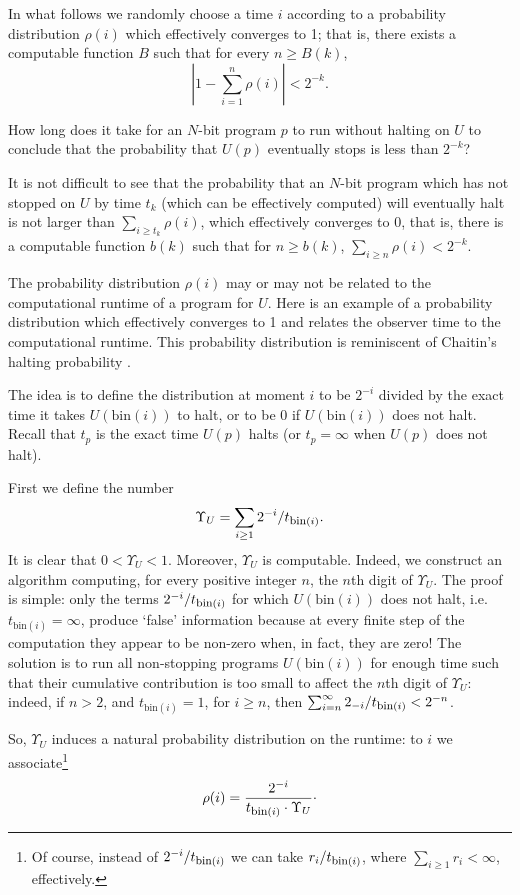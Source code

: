 \documentclass[12pt,twoside,openright]{report}
\newcommand{\bin}{\mbox{bin}}
\newcommand{\fbin}{\mbox{\rm \footnotesize{bin}}}
\begin{document}
In what follows we randomly choose a time $i$ according to a probability distribution $\rho(i)$ which effectively converges to 1; that is, there exists a computable function $B$ such that for every $n\ge B(k)$, $$|1-\sum_{i=1}^{n}\rho(i)|< 2^{-k}.$$  

How long does it take for an $N$-bit program $p$ to run without halting on $U$ to conclude that the probability that $U(p)$ eventually stops is less than $2^{-k}$?
 
It is not difficult to see that the probability that an $N$-bit program which has not stopped on $U$ by time $t_{k}$ (which can be effectively computed) will eventually halt is not larger than $\sum_{i\ge t_{k}} \rho(i)$, which effectively converges to 0, that is, there is a computable function $b(k)$ such that for $n\ge b(k)$, $\sum_{i\ge n} \rho(i) < 2^{-k}$.
   
The probability distribution $\rho(i)$ may or may not be related to the computational runtime of a program for $U$. Here is an example of a probability distribution which effectively converges to 1 and relates the observer time to the computational runtime. This probability distribution is reminiscent of Chaitin's halting probability \cite{Calude}.

The idea is to define the distribution at moment $i$ to be $2^{-i}$ divided by the exact time it takes $U(\bin(i))$ to halt, or to be 0 if $U(\bin(i))$ does not halt.  Recall that $t_{p}$ is the exact time $U(p)$ halts (or $t_{p}=\infty$ when $U(p)$ does not halt). 

First we define the number
\[\Upsilon_{U}=\sum_{i\ge 1}2^{-i}/t_{\fbin(i)}. \]
It is clear that $0<\Upsilon_{U}<1$. Moreover,  $\Upsilon_{U}$ is computable.  Indeed, we construct an algorithm computing, for every positive integer $n$, the $n$th digit of $\Upsilon_{U}.$ The proof is simple: only the terms $2^{-i}/t_{\fbin(i)}$ for which $U(\bin(i))$ does not halt, i.e.\ $t_{\bin(i)}=\infty$,  produce `false' information because at every finite step of the computation they appear to be non-zero when, in fact, they are zero! The solution is to run all non-stopping programs $U(\bin(i))$ for enough time such that their cumulative contribution is too small to affect the $n$th digit of $\Upsilon_{U}$: indeed, if $n>2$, and $t_{\bin(i)}= 1$, for $i\ge n$, then $\sum_{i=n}^{\infty} 2_{-i}/t_{\fbin(i)}< 2^{-n}$.
 

So,  $\Upsilon_{U}$  induces a natural probability distribution on the runtime: to $i$ we associate\footnote{Of course, instead of $2^{-i}/t_{\fbin(i)}$ we can take $r_i/t_{\fbin(i)}$, where $\sum_{i\ge 1}r_i <\infty$, effectively.}
\begin{equation}
\label{timed}
\rho(i)= \frac{2^{-i}}{t_{\fbin(i)}\cdot \Upsilon_{U}}\raisebox{0.5ex}.
\end{equation}
\end{document}
